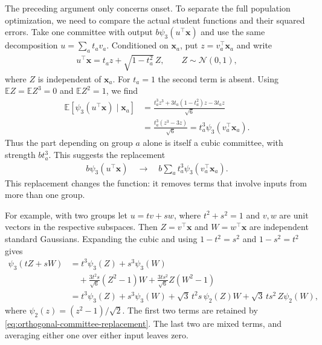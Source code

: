 \documentclass[11pt, reqno]{amsart}
\theoremstyle{notestyle}
\theoremstyle{defstyle}
\begin{document}
The preceding argument only concerns onset.
To separate the full population optimization, we need to compare the actual student functions and their squared errors.
Take one committee with output $b\psi_3(u^\top\mathbf x)$ and use the same decomposition $u=\sum_a t_av_a$.
Conditioned on $\mathbf x_a$, put $z=v_a^\top\mathbf x_a$ and write
\begin{align*}
    u^\top\mathbf x=t_az+\sqrt{1-t_a^2}\,Z,
    \qquad Z\sim\mathcal N(0,1),
\end{align*}
where $Z$ is independent of $\mathbf x_a$.
For $t_a=1$ the second term is absent.
Using $\mathbb E Z=\mathbb E Z^3=0$ and $\mathbb E Z^2=1$, we find
\begin{align*}
    \mathbb E[\psi_3(u^\top\mathbf x)\mid\mathbf x_a]
    &=\frac{t_a^3z^3+3t_a(1-t_a^2)z-3t_az}{\sqrt6} \\
    &=\frac{t_a^3(z^3-3z)}{\sqrt6}
      =t_a^3\psi_3(v_a^\top\mathbf x_a).
\end{align*}
Thus the part depending on group $a$ alone is itself a cubic committee, with strength $bt_a^3$.
This suggests the replacement
\begin{align}\label{eq:orthogonal-committee-replacement}
    b\psi_3(u^\top\mathbf x)
    \quad\longrightarrow\quad
    b\sum_a t_a^3\psi_3(v_a^\top\mathbf x_a).
\end{align}
This replacement changes the function: it removes terms that involve inputs from more than one group.

For example, with two groups let $u=tv+sw$, where $t^2+s^2=1$ and $v,w$ are unit vectors in the respective subspaces.
Then $Z=v^\top\mathbf x$ and $W=w^\top\mathbf x$ are independent standard Gaussians.
Expanding the cubic and using $1-t^2=s^2$ and $1-s^2=t^2$ gives
\begin{align*}
    \psi_3(tZ+sW)
    &=t^3\psi_3(Z)+s^3\psi_3(W) \\
    &\quad+\frac{3t^2s}{\sqrt6}(Z^2-1)W
      +\frac{3ts^2}{\sqrt6}Z(W^2-1) \\
    &=t^3\psi_3(Z)+s^3\psi_3(W)
      +\sqrt3\,t^2s\,\psi_2(Z)W
      +\sqrt3\,ts^2\,Z\psi_2(W),
\end{align*}
where $\psi_2(z)=(z^2-1)/\sqrt2$.
The first two terms are retained by \eqref{eq:orthogonal-committee-replacement}.
The last two are mixed terms, and averaging either one over either input leaves zero.
\end{document}
